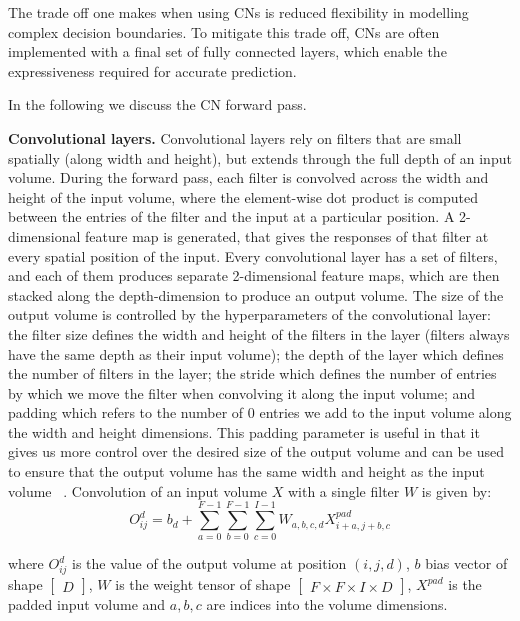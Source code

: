 \noindent The trade off one makes when using CNs is reduced flexibility in modelling complex decision boundaries. To mitigate this trade off, CNs are often implemented with a final set of fully connected layers, which enable the expressiveness required for accurate prediction. \par

\noindent In the following we discuss the CN forward pass. \par

\noindent \textbf{Convolutional layers.} Convolutional layers rely on filters that are small spatially (along width and height), but extends through the full depth of an input volume. During the forward pass, each filter is convolved across the width and height of the input volume, where the element-wise dot product is computed between the entries of the filter and the input at a particular position. A 2-dimensional feature map is generated, that gives the responses of that filter at every spatial position of the input. Every convolutional layer has a set of filters, and each of them produces separate 2-dimensional feature maps, which are then stacked along the depth-dimension to produce an output volume. The size of the output volume is controlled by the hyperparameters of the convolutional layer: the filter size defines the width and height of the filters in the layer (filters always have the same depth as their input volume); the depth of the layer which defines the number of filters in the layer; the stride which defines the number of entries by which we move the filter when convolving it along the input volume; and padding which refers to the number of 0 entries we add to the input volume along the width and height dimensions. This padding parameter is useful in that it gives us more control over the desired size of the output volume and can be used to ensure that the output volume has the same width and height as the input volume \unskip ~\citep{DLIndaba2017}. Convolution of an input volume $X$ with a single filter $W$ is given by: 
\begin{equation}
	O_{ij}^{d} = b_d + \sum_{a=0}^{F - 1}\sum_{b=0}^{F - 1}\sum_{c=0}^{I - 1}W_{a,b,c,d}X_{i+a,j+b,c}^{pad}
\end{equation}

\noindent where $O_{ij}^d$ is the value of the output volume at position $(i,j,d)$, $b$ bias vector of shape $\left [ \begin{matrix} D \end{matrix} \right]$, $W$ is the weight tensor of shape $\left [ \begin{matrix} F \times F \times I \times D \end{matrix} \right]$, $X^{pad}$ is the padded input volume and $a, b, c$ are indices into the volume dimensions. \par


